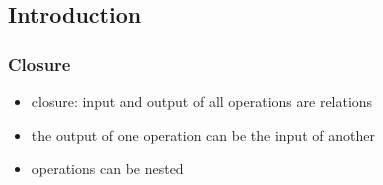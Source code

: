\documentclass[dvipsnames]{beamer}
\theoremstyle{plain}
\begin{document}
\subsection{Introduction}

\begin{frame}
  \frametitle{Closure}

  \begin{itemize}
    \item \alert{closure}: input and output of all operations are relations

    \medskip
    \item the output of one operation can be the input of another
    \item operations can be nested
  \end{itemize}
\end{frame}
\end{document}
